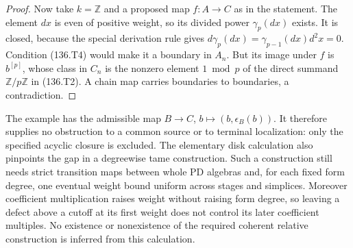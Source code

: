 \begin{proof}
Now take $k=\mathbb Z$ and a proposed map $f:A\to C$ as in
the statement. The element $dx$ is even of positive weight,
so its divided power $\gamma_p(dx)$ exists. It is closed,
because the special derivation rule gives
$d\gamma_p(dx)=\gamma_{p-1}(dx)d^2x=0$.
Condition (136.T4) would make it a boundary in $A_n$.
But its image under $f$ is $b^{[p]}$, whose class in $C_n$
is the nonzero element $1\bmod p$ of the direct summand
$\mathbb Z/p\mathbb Z$ in (136.T2). A chain map carries
boundaries to boundaries, a contradiction.
\end{proof}

The example has the admissible map
$B\to C$, $b\mapsto(b,\epsilon_B(b))$.
It therefore supplies no obstruction to a common source
or to terminal localization: only the specified acyclic
closure is excluded. The elementary disk calculation also
pinpoints the gap in a degreewise tame construction. Such a
construction still needs strict transition maps between whole
PD algebras and, for each fixed form degree, one eventual weight
bound uniform across stages and simplices. Moreover coefficient
multiplication raises weight without raising form degree, so
leaving a defect above a cutoff at its first weight does not
control its later coefficient multiples. No existence or
nonexistence of the required coherent relative construction
is inferred from this calculation.

